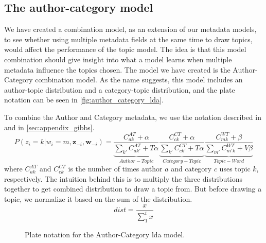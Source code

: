 \subsection{The author-category model}\label{sec:combination}
We have created a combination model, as an extension of our metadata models, to see whether using multiple metadata fields at the same time to draw topics, would affect the performance of the topic model.
The idea is that this model combination should give insight into what a model learns when multiple metadata influence the topics chosen.
The model we have created is the Author-Category combination model.
As the name suggests, this model includes an author-topic distribution and a category-topic distribution, and the plate notation can be seen in \autoref{fig:author_category_lda}.

To combine the Author and Category metadata, we use the notation described in \citet{author_topic_2012} and in \ref{sec:appendix_gibbs}.
\begin{equation}
		P(z_i = k |w_i = m, \boldsymbol{z}_{-i}, \boldsymbol{w}_{-i}) = 
	\underbrace{\frac{C^{AT}_{ak} + \alpha}{\sum_{k'} C^{AT}_{ak'} + T\alpha}}_{Author-Topic}
	\underbrace{\frac{C^{CT}_{ck} + \alpha}{\sum_{k'} C^{CT}_{ck'} + T\alpha}}_{Category-Topic}
	\underbrace{\frac{C^{WT}_{mk} + \beta}{\sum_{m'} C^{WT}_{m'k} + V\beta}}_{Topic-Word}
\end{equation}
where $C^{AT}_{ak}$ and $C^{CT}_{ck}$ is the number of times author $a$ and category $c$ uses topic $k$, respectively.
The intuition behind this is to multiply the three distributions together to get combined distribution to draw a topic from.
But before drawing a topic, we normalize it based on the sum of the distribution.
\begin{equation}
	dist = \frac{x}{\sum_{1}^{t} x}
\end{equation}

\begin{figure*}[ht]
	\centering
	\resizebox{.3\textwidth}{!}{%
		
	}
	\caption{Plate notation for the Author-Category \gls{lda} model.}
	\label{fig:author_category_lda}
\end{figure*}




